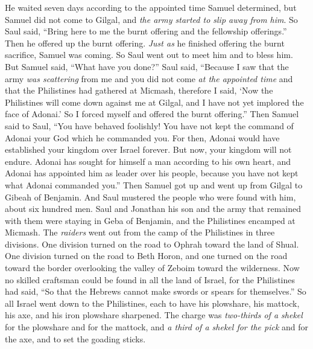 \begin{biblechapter}
\verse He waited seven days according to the appointed time Samuel determined, but Samuel did not come to Gilgal, and \textit{the army started to slip away from him}.
\verse So Saul said, “Bring here to me the burnt offering and the fellowship offerings.” Then he offered up the burnt offering.
\verse \textit{Just as} he finished offering the burnt sacrifice, Samuel was coming. So Saul went out to meet him and to bless him.
\verse But Samuel said, “What have you done?” Saul said, “Because I saw that the army \textit{was scattering} from me and you did not come \textit{at the appointed time} and that the Philistines had gathered at Micmash,
\verse therefore I said, ‘Now the Philistines will come down against me at Gilgal, and I have not yet implored the face of Adonai.’ So I forced myself and offered the burnt offering.”
\verse Then Samuel said to Saul, “You have behaved foolishly! You have not kept the command of Adonai your God which he commanded you. For then, Adonai would have established your kingdom over Israel forever.
\verse But now, your kingdom will not endure. Adonai has sought for himself a man according to his own heart, and Adonai has appointed him as leader over his people, because you have not kept what Adonai commanded you.”
\verse Then Samuel got up and went up from Gilgal to Gibeah of Benjamin. And Saul mustered the people who were found with him, about six hundred men.
\verse Saul and Jonathan his son and the army that remained with them were staying in Geba of Benjamin, and the Philistines encamped at Micmash.
\verse The \textit{raiders} went out from the camp of the Philistines in three divisions. One division turned on the road to Ophrah toward the land of Shual.
\verse One division turned on the road to Beth Horon, and one turned on the road toward the border overlooking the valley of Zeboim toward the wilderness.
\verse Now no skilled craftsman could be found in all the land of Israel, for the Philistines had said, “So that the Hebrews cannot make swords or spears for themselves.”
\verse So all Israel went down to the Philistines, each to have his plowshare, his mattock, his axe, and his iron plowshare sharpened.
\verse The charge was \textit{two-thirds of a shekel} for the plowshare and for the mattock, and \textit{a third of a shekel for the pick} and for the axe, and to set the goading sticks.

\end{biblechapter}
